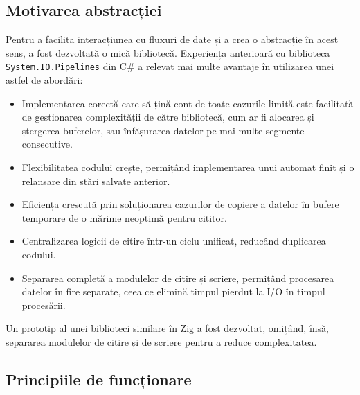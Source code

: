 \documentclass[a4paper,12pt]{report}
\begin{document}
\subsection{Motivarea abstracției}

Pentru a facilita interacțiunea cu fluxuri de date și a crea o abstracție în acest sens,
a fost dezvoltată o mică bibliotecă.
Experiența anterioară cu biblioteca \texttt{System.IO.Pipelines}\cite{system_io_pipelines}
din C\# a relevat mai multe avantaje în utilizarea unei astfel de abordări:
\begin{itemize}
  \item
  Implementarea corectă care să țină cont de toate cazurile-limită
  este facilitată de gestionarea complexității de către
  bibliotecă, cum ar fi alocarea și ștergerea buferelor,
  sau înfășurarea datelor pe mai multe segmente consecutive.

  \item
  Flexibilitatea codului crește, permițând implementarea unui automat finit
  și o relansare din stări salvate anterior.

  \item
  Eficiența crescută prin soluționarea cazurilor de copiere a datelor în bufere temporare
  de o mărime neoptimă pentru cititor.

  \item
  Centralizarea logicii de citire într-un ciclu unificat,
  reducând duplicarea codului.

  \item
  Separarea completă a modulelor de citire și scriere,
  permițând procesarea datelor în fire separate,
  ceea ce elimină timpul pierdut la \ac{I/O} în timpul procesării.
\end{itemize}

Un prototip al unei biblioteci similare în Zig a fost dezvoltat,
omițând, însă, separarea modulelor de citire și de scriere pentru a reduce complexitatea.

\subsection{Principiile de funcționare}
\end{document}
